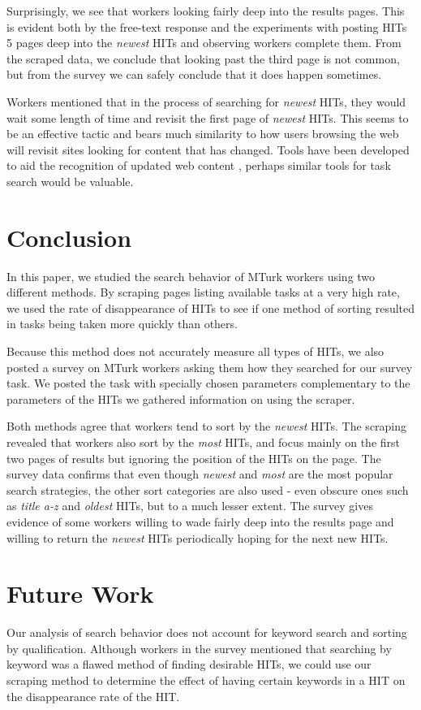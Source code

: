 \documentclass{acm_proc_article-sp}
\begin{document}
Surprisingly, we see that workers looking fairly deep into the results
pages.  This is evident both by the free-text response and the
experiments with posting HITs 5 pages deep into the {\em newest} HITs
and observing workers complete them.  From the scraped data, we
conclude that looking past the third page is not common, but from the
survey we can safely conclude that it does happen sometimes.

Workers mentioned that in the process of searching for {\em newest}
HITs, they would wait some length of time and revisit the first page
of {\em newest} HITs.  This seems to be an effective tactic and bears
much similarity to how users browsing the web will revisit sites
looking for content that has changed.  Tools have been developed to
aid the recognition of updated web content \cite{teevan2009changing,
  adar2008zoetrope}, perhaps similar tools for task search would be
valuable.


\section{Conclusion}
In this paper, we studied the search behavior of MTurk workers
using two different methods.  By scraping pages listing available
tasks at a very high rate, we used the rate of disappearance of HITs
to see if one method of sorting resulted in tasks being taken more
quickly than others.  

Because this method does not accurately measure all types of HITs, we
also posted a survey on MTurk workers asking them how they searched
for our survey task.  We posted the task with specially chosen
parameters complementary to the parameters of the HITs we gathered
information on using the scraper.

Both methods agree that workers tend to sort by the {\em newest} HITs.
The scraping revealed that workers also sort by the {\em most} HITs,
and focus mainly on the first two pages of results but ignoring the position of the HITs on the page.  The survey data
confirms that even though {\em newest} and {\em most} are the most
popular search strategies, the other sort categories are also used -
even obscure ones such as {\em title a-z} and {\em oldest} HITs, but
to a much lesser extent.  The survey gives evidence of some workers
willing to wade fairly deep into the results page and willing to
return the {\em newest} HITs periodically hoping for the next new
HITs.

\section{Future Work}
Our analysis of search behavior does not account for keyword search
and sorting by qualification.  Although workers in the survey
mentioned that searching by keyword was a flawed method of finding
desirable HITs, we could use our scraping method to determine the
effect of having certain keywords in a HIT on the disappearance rate
of the HIT.



\end{document}
